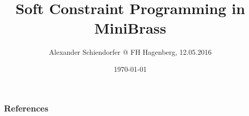 \documentclass[handout,10pt,xcolor={dvipsnames},fleqn]{beamer}
\title{Soft Constraint Programming in MiniBrass}
\author{Alexander Schiendorfer @ FH Hagenberg, 12.05.2016}
\date{\today}
\begin{document}
\titleframe



\begin{frame}[allowframebreaks]
        \frametitle{References}
        
        
\end{frame}
\end{document}
